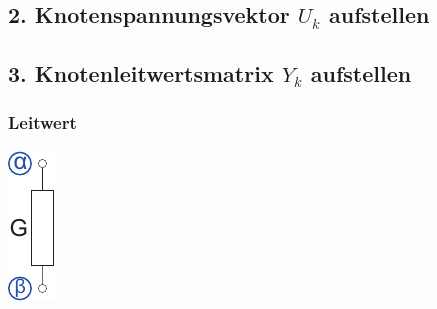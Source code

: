 \documentclass[a4paper,twocolumn,10pt]{article}
\begin{document}
\subsection*{2. Knotenspannungsvektor $U_k$ aufstellen}
\subsection*{3. Knotenleitwertsmatrix $Y_k$ aufstellen}
\subsubsection*{Leitwert}
\begin{minipage}[b]{0.05\textwidth}
\includegraphics[width=\textwidth]{Grafiken/KSA_Widerstand}
\end{minipage}
\end{document}

